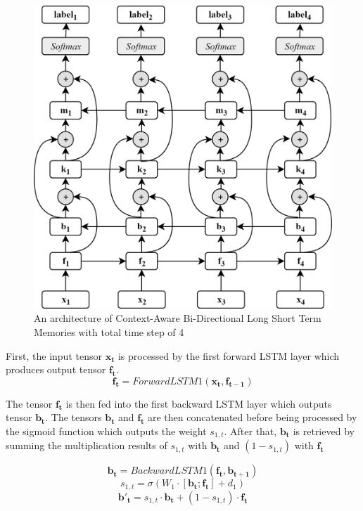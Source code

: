 \begin{figure}
	\centering
	\includegraphics[width=0.75\linewidth]{images/dblstmhighway}
	\caption{An architecture of Context-Aware Bi-Directional Long Short Term Memories with total time step of 4}
	\label{fig:dblstmhighway}
\end{figure}

First, the input tensor $\mathbf{x_{t}}$ is processed by the first forward LSTM layer which produces output tensor $\mathbf{f_{t}}$.
\begin{equation}
\label{eq:forwardhighway1}
\mathbf{f_{t}} = ForwardLSTM1(\mathbf{x_{t}}, \mathbf{f_{t-1}})
\end{equation}

The tensor $\mathbf{f_{t}}$ is then fed into the first backward LSTM layer which outputs tensor $\mathbf{b_{t}}$. The tensors $\mathbf{b_{t}}$ and $\mathbf{f_{t}}$ are then concatenated before being processed by the sigmoid function which outputs the weight $s_{1,t}$. After that, $\mathbf{b_{t}}$ is retrieved by summing the multiplication results of $s_{1,t}$ with $\mathbf{b_{t}}$ and $(1 - s_{1,t})$ with $\mathbf{f_{t}}$

\begin{equation}
\label{eq:backwardhighway1}
\mathbf{b_{t}} = BackwardLSTM1(\mathbf{f_{t}}, \mathbf{b_{t+1}})
\end{equation}
\begin{equation}
	s_{1,t} = \sigma(W_{1} \cdot [\mathbf{b_{t}}; \mathbf{f_{t}}] + d_{1})
\end{equation}
\begin{equation}
	\mathbf{b'_{t}} = s_{1,t} \cdot \mathbf{b_{t}} + (1 - s_{1,t}) \cdot \mathbf{f_{t}} 
\end{equation}

